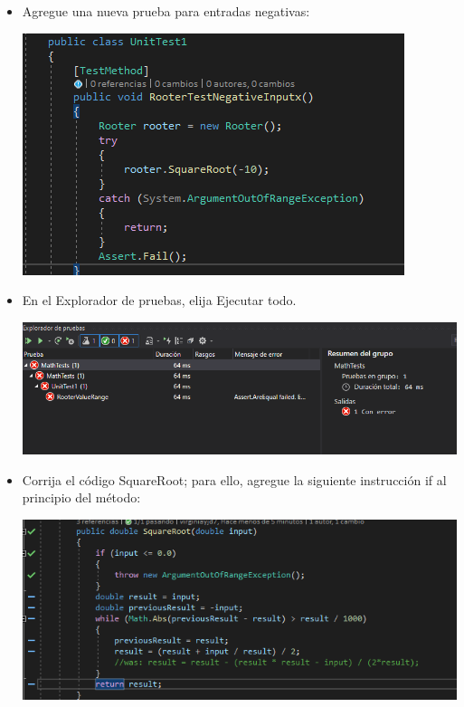 \begin{itemize}

\item Agregue una nueva prueba para entradas negativas:
\begin{center}
\includegraphics[width=\columnwidth]{images/13}\newline
\end{center}
\item En el Explorador de pruebas, elija Ejecutar todo.
\begin{center}
\includegraphics[width=\columnwidth]{images/11}\newline
\end{center}
\item Corrija el código SquareRoot; para ello, agregue la siguiente instrucción if al principio del método:
\begin{center}
\includegraphics[width=\columnwidth]{images/16}\newline

\end{center}
\end{itemize}
